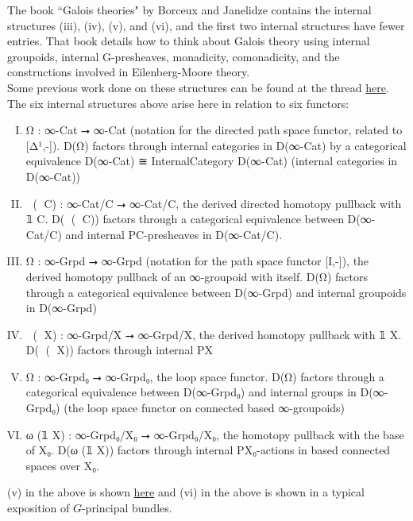 \documentclass{book}
\theoremstyle{definition}
\begin{document}
The book ``Galois theories" by Borceux and Janelidze contains the internal structures (iii), (iv), (v), and (vi), and the first two internal structures have fewer entries. That book details how to think about Galois theory using internal groupoids, internal G-presheaves, monadicity, comonadicity, and the constructions involved in Eilenberg-Moore theory.\\

Some previous work done on these structures can be found at the thread \href{https://leanprover.zulipchat.com/#narrow/stream/116395-maths/topic/Internal.20categories}{here}.\\

The six internal structures above arise here in relation to six functors:

\begin{enumerate}[(I)]
\item Ω⃗ : ∞-Cat ⭢ ∞-Cat (notation for the directed path space functor, related to [Δ¹,-]). D(Ω⃗) factors through internal categories in D(∞-Cat) by a categorical equivalence D(∞-Cat) ≅ InternalCategory D(∞-Cat) (internal categories in D(∞-Cat))
\item ω⃗ (𝟙 C) : ∞-Cat/C ⭢ ∞-Cat/C, the derived directed homotopy pullback with 𝟙 C. D(ω⃗ (𝟙 C)) factors through a categorical equivalence between D(∞-Cat/C) and internal P⃗C-presheaves in D(∞-Cat/C).
\item Ω⃡ : ∞-Grpd ⭢ ∞-Grpd (notation for the path space functor [I,-]), the derived homotopy pullback of an ∞-groupoid with itself. D(Ω⃡) factors through a categorical equivalence between D(∞-Grpd) and internal groupoids in D(∞-Grpd)
\item ω⃡ (𝟙 X) : ∞-Grpd/X ⭢ ∞-Grpd/X, the derived homotopy pullback with 𝟙 X. D(ω⃡ (𝟙 X)) factors through internal P⃡X
\item Ω : ∞-Grpd₀ ⭢ ∞-Grpd₀, the loop space functor. D(Ω) factors through a categorical equivalence between D(∞-Grpd₀) and internal groups in D(∞-Grpd₀) (the loop space functor on connected based ∞-groupoids)
\item ω (𝟙 X) : ∞-Grpd₀/X₀ ⭢ ∞-Grpd₀/X₀, the homotopy pullback with the base of X₀. D(ω (𝟙 X)) factors through internal PX₀-actions in based connected spaces over X₀.
\end{enumerate}

(v) in the above is shown \href{https://mathoverflow.net/questions/128883/why-omega-x-and-bg-are-adjoint-functors}{here} and (vi) in the above is shown in a typical exposition of $G$-principal bundles.\\
\end{document}
